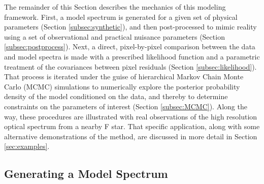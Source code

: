 \documentclass[iop,floatfix]{emulateapj}
\begin{document}
The remainder of this Section describes the mechanics of this modeling framework.  First, a model 
spectrum is generated for a given set of physical parameters (Section \ref{subsec:synthetic}), and 
then post-processed to mimic reality using a set of observational and practical nuisance parameters 
(Section \ref{subsec:postprocess}).  Next, a direct, pixel-by-pixel comparison between the data and 
model spectra is made with a prescribed likelihood function and a parametric treatment of the 
covariances between pixel residuals (Section \ref{subsec:likelihood}).  That process is iterated 
under the guise of hierarchical Markov Chain Monte Carlo (MCMC) simulations to numerically explore 
the posterior probability density of the model conditioned on the data, and thereby to determine 
constraints on the parameters of interest (Section \ref{subsec:MCMC}).  Along the way, these 
procedures are illustrated with real observations of the high resolution optical spectrum from a 
nearby F star.  That specific application, along with some alternative demonstrations of the 
method, are discussed in more detail in Section \ref{sec:examples}.


\subsection{Generating a Model Spectrum \label{subsec:synthetic}}
\end{document}
